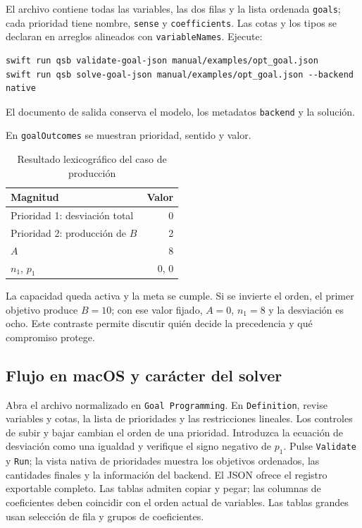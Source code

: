 El archivo  contiene todas las variables,
las dos filas y la lista ordenada \texttt{goals}; cada prioridad tiene nombre,
\texttt{sense} y \texttt{coefficients}. Las cotas y los tipos se declaran en
arreglos alineados con \texttt{variableNames}. Ejecute:
\begin{lstlisting}
swift run qsb validate-goal-json manual/examples/opt_goal.json
swift run qsb solve-goal-json manual/examples/opt_goal.json --backend native
\end{lstlisting}
El documento de salida conserva el modelo, los metadatos \texttt{backend} y
la solución.

En \texttt{goalOutcomes} se muestran prioridad, sentido y valor.
\begin{table}[htbp]
\centering
\caption{Resultado lexicográfico del caso de producción}
\begin{tabular}{lr}
\toprule
Magnitud & Valor \\
\midrule
Prioridad 1: desviación total & 0 \\
Prioridad 2: producción de \(B\) & 2 \\
\(A\) & 8 \\
\(n_1\), \(p_1\) & 0, 0 \\
\bottomrule
\end{tabular}
\end{table}
La capacidad queda activa y la meta se cumple. Si se invierte el orden, el
primer objetivo produce \(B=10\); con ese valor fijado, \(A=0\), \(n_1=8\)
y la desviación es ocho. Este contraste permite discutir quién decide la
precedencia y qué compromiso protege.

\subsection{Flujo en macOS y carácter del solver}
Abra el archivo normalizado en \texttt{Goal Programming}. En
\texttt{Definition}, revise variables y cotas, la lista de prioridades y las
restricciones lineales. Los controles de subir y bajar cambian el orden de
una prioridad. Introduzca la ecuación de desviación como una igualdad y
verifique el signo negativo de \(p_1\). Pulse \texttt{Validate} y
\texttt{Run}; la vista nativa de prioridades muestra los objetivos ordenados,
las cantidades finales y la información del backend. El JSON ofrece el
registro exportable completo. Las tablas admiten copiar y pegar; las columnas
de coeficientes deben coincidir con el orden actual de variables. Las tablas
grandes usan selección de fila y grupos de coeficientes.

